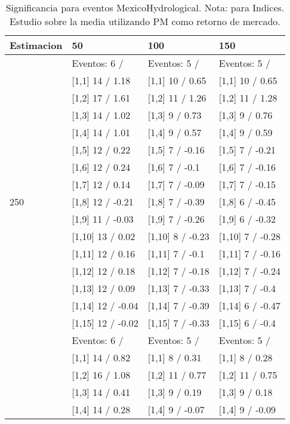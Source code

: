 \begin{table}

\caption{Significancia para eventos MexicoHydrological. Nota: para Indices. Estudio sobre la media utilizando PM como retorno de mercado.}
\centering
\begin{tabular}[t]{llll}
\toprule
Estimacion & 50 & 100 & 150\\
\midrule
 & Eventos:  6 / & Eventos:  5 / & Eventos:  5 /\\
 & {}[1,1] 14  / 1.18 & {}[1,1] 10  / 0.65 & {}[1,1] 10  / 0.65\\
 & {}[1,2] 17  / 1.61 & {}[1,2] 11  / 1.26 & {}[1,2] 11  / 1.28\\
 & {}[1,3] 14  / 1.02 & {}[1,3] 9  / 0.73 & {}[1,3] 9  / 0.76\\
 & {}[1,4] 14  / 1.01 & {}[1,4] 9  / 0.57 & {}[1,4] 9  / 0.59\\
\addlinespace
 & {}[1,5] 12  / 0.22 & {}[1,5] 7  / -0.16 & {}[1,5] 7  / -0.21\\
 & {}[1,6] 12  / 0.24 & {}[1,6] 7  / -0.1 & {}[1,6] 7  / -0.16\\
 & {}[1,7] 12  / 0.14 & {}[1,7] 7  / -0.09 & {}[1,7] 7  / -0.15\\
250 & {}[1,8] 12  / -0.21 & {}[1,8] 7  / -0.39 & {}[1,8] 6  / -0.45\\
 & {}[1,9] 11  / -0.03 & {}[1,9] 7  / -0.26 & {}[1,9] 6  / -0.32\\
\addlinespace
 & {}[1,10] 13  / 0.02 & {}[1,10] 8  / -0.23 & {}[1,10] 7  / -0.28\\
 & {}[1,11] 12  / 0.16 & {}[1,11] 7  / -0.1 & {}[1,11] 7  / -0.16\\
 & {}[1,12] 12  / 0.18 & {}[1,12] 7  / -0.18 & {}[1,12] 7  / -0.24\\
 & {}[1,13] 12  / 0.09 & {}[1,13] 7  / -0.33 & {}[1,13] 7  / -0.4\\
 & {}[1,14] 12  / -0.04 & {}[1,14] 7  / -0.39 & {}[1,14] 6  / -0.47\\
\addlinespace
 & {}[1,15] 12  / -0.02 & {}[1,15] 7  / -0.33 & {}[1,15] 6  / -0.4\\
 & Eventos:  6 / & Eventos:  5 / & Eventos:  5 /\\
 & {}[1,1] 14  / 0.82 & {}[1,1] 8  / 0.31 & {}[1,1] 8  / 0.28\\
 & {}[1,2] 16  / 1.08 & {}[1,2] 11  / 0.77 & {}[1,2] 11  / 0.75\\
 & {}[1,3] 14  / 0.41 & {}[1,3] 9  / 0.19 & {}[1,3] 9  / 0.18\\
\addlinespace
 & {}[1,4] 14  / 0.28 & {}[1,4] 9  / -0.07 & {}[1,4] 9  / -0.09\\

\end{tabular}
\end{table}
